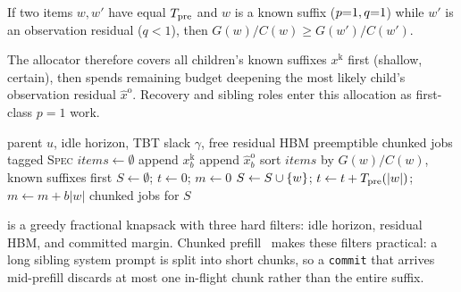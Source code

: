\begin{proposition}
If two items $w,w'$ have equal $T_{\mathrm{pre}}$ and $w$ is a known suffix ($p{=}1,q{=}1$) while $w'$ is an observation residual ($q<1$), then $G(w)/C(w) \ge G(w')/C(w')$.
\end{proposition}
The allocator therefore covers all children's known suffixes $x^{\mathrm{k}}$ first (shallow, certain), then spends remaining budget deepening the most likely child's observation residual $\hat{x}^{\mathrm{o}}$.
Recovery and sibling roles enter this allocation as first-class $p{=}1$ work.

\begin{algorithm}[t]
\caption{SpeculateBudget($u$, $\Idle$, $\gamma$, $M_{\mathrm{free}}$)}
\label{alg:budget}
\small
\begin{algorithmic}[1]
\REQUIRE parent $u$, idle horizon, TBT slack $\gamma$, free residual HBM
\ENSURE preemptible chunked jobs tagged \textsc{Spec}
\STATE $\mathit{items} \gets \emptyset$
  \STATE append $x^{\mathrm{k}}_b$ 
    \STATE append $\hat{x}^{\mathrm{o}}_b$
  \ENDIF
\ENDFOR
\STATE sort $\mathit{items}$ by $G(w)/C(w)$, known suffixes first
\STATE $S \gets \emptyset$; $t \gets 0$; $m \gets 0$
    \STATE $S \gets S \cup \left\{w\right\}$; $t \gets t+T_{\mathrm{pre}}(|w|)$; $m \gets m+b|w|$
  \ENDIF
\ENDFOR
\RETURN chunked jobs for $S$
\end{algorithmic}
\end{algorithm}

 is a greedy fractional knapsack with three hard filters: idle horizon, residual HBM, and committed \tbt{} margin.
Chunked prefill~\cite{sarathisplit} makes these filters practical: a long sibling system prompt is split into short chunks, so a \texttt{commit} that arrives mid-prefill discards at most one in-flight chunk rather than the entire suffix.

